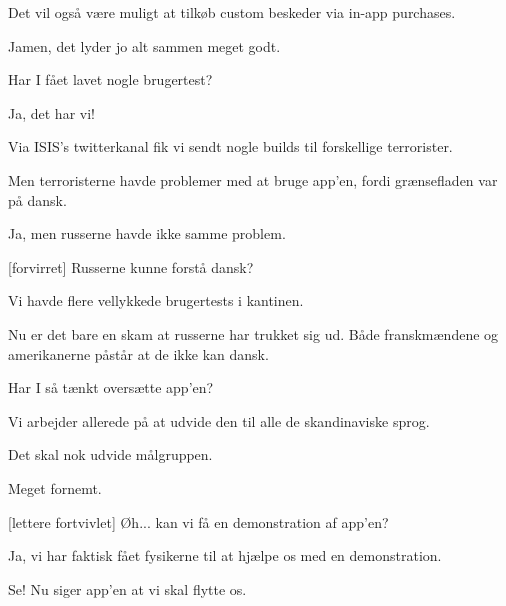 \documentclass[a4paper,11pt]{article}
\begin{document}
\begin{sketch}
 Det vil også være muligt at tilkøb custom beskeder via in-app purchases.

 Jamen, det lyder jo alt sammen meget godt.

 Har I fået lavet nogle brugertest?

 Ja, det har vi!

 Via ISIS's twitterkanal fik vi sendt nogle builds til forskellige terrorister.

 Men terroristerne havde problemer med at bruge app'en, fordi grænsefladen var på dansk.

 Ja, men russerne havde ikke samme problem.

[forvirret] Russerne kunne forstå dansk?

 Vi havde flere vellykkede brugertests i kantinen.

 Nu er det bare en skam at russerne har trukket sig ud.  Både franskmændene og amerikanerne påstår at de ikke kan dansk.

 Har I så tænkt oversætte app'en?

 Vi arbejder allerede på at udvide den til alle de skandinaviske sprog.

 Det skal nok udvide målgruppen.

 Meget fornemt.

[lettere fortvivlet] Øh...  kan vi få en demonstration af app'en?

 Ja, vi har faktisk fået fysikerne til at hjælpe os med en demonstration.



 Se!  Nu siger app'en at vi skal flytte os.



\end{sketch}
\end{document}
